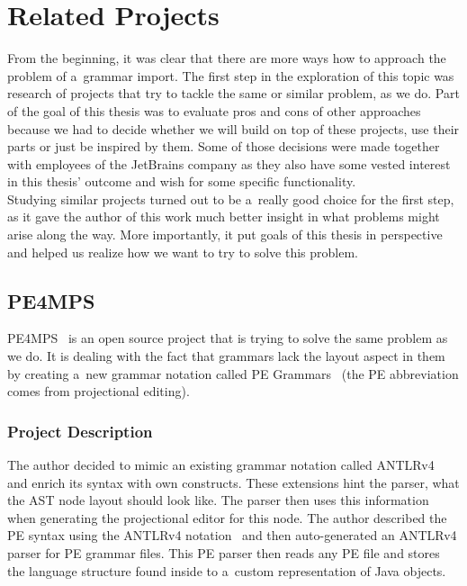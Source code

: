 \chapter{Related Projects}
\label{chap:related_projects}

From the beginning, it was clear that there are more ways how to approach the problem of a~grammar import.
The first step in the exploration of this topic was research of projects that try to tackle the same or similar problem, as we do.
Part of the goal of this thesis was to evaluate pros and cons of other approaches because we had to decide whether we will build on top of these projects, use their parts or just be inspired by them.
Some of those decisions were made together with employees of the JetBrains company as they also have some vested interest in this thesis' outcome and wish for some specific functionality.
\\

Studying similar projects turned out to be a~really good choice for the first step, as it gave the author of this work much better insight in what problems might arise along the way.
More importantly, it put goals of this thesis in perspective and helped us realize how we want to try to solve this problem.

\section{PE4MPS}
\label{chap:pe4mps}
PE4MPS~\cite{PE4MPS} is an open source project that is trying to solve the same problem as we do.
It is dealing with the fact that grammars lack the layout aspect in them by creating a~new grammar notation called PE Grammars~\cite{PE} (the PE abbreviation comes from projectional editing).

\subsection{Project Description}
The author decided to mimic an existing grammar notation called ANTLRv4~\cite{ANTLR4} and enrich its syntax with own constructs.
These extensions hint the parser, what the AST node layout should look like.
The parser then uses this information when generating the projectional editor for this node.
The author described the PE syntax using the ANTLRv4 notation~\cite{ANTLR4reference} and then auto-generated an ANTLRv4 parser for PE grammar files.
This PE parser then reads any PE file and stores the language structure found inside to a~custom representation of Java objects.
\\

